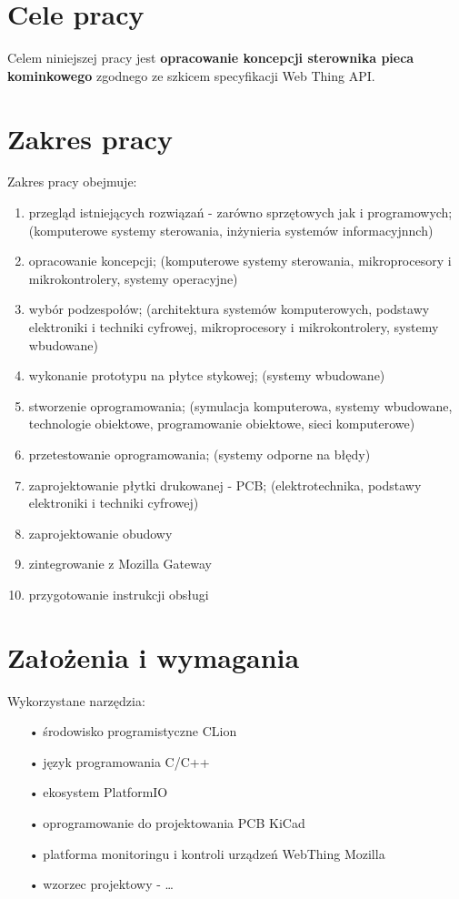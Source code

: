 \documentclass[12pt]{report}
\begin{document}
 \section{Cele pracy}
 Celem niniejszej pracy jest \textbf{opracowanie koncepcji sterownika pieca kominkowego} zgodnego ze szkicem specyfikacji Web Thing API.
 
 \section{Zakres pracy}
 Zakres pracy obejmuje:
 \begin{enumerate}
 \item przegląd istniejących rozwiązań - zarówno sprzętowych jak i programowych; (komputerowe systemy sterowania, inżynieria systemów informacyjnnch)
 \item opracowanie koncepcji; (komputerowe systemy sterowania, mikroprocesory i mikrokontrolery, systemy operacyjne)
 \item wybór podzespołów; (architektura systemów komputerowych, podstawy elektroniki i techniki cyfrowej, mikroprocesory i mikrokontrolery, systemy wbudowane)
 \item wykonanie prototypu na płytce stykowej; (systemy wbudowane)
 \item stworzenie oprogramowania; (symulacja komputerowa, systemy wbudowane, technologie obiektowe, programowanie obiektowe, sieci komputerowe)
 \item przetestowanie oprogramowania; (systemy odporne na błędy)
 \item zaprojektowanie płytki drukowanej - PCB; (elektrotechnika, podstawy elektroniki i techniki cyfrowej)
 \item zaprojektowanie obudowy
 \item zintegrowanie z Mozilla Gateway
 \item przygotowanie instrukcji obsługi
 \end{enumerate}
 
 \section{Założenia i wymagania}
 
 Wykorzystane narzędzia:
 \begin{enumerate}
 \item[•] środowisko programistyczne CLion
 \item[•] język programowania C/C++
 \item[•] ekosystem PlatformIO
 \item[•] oprogramowanie do projektowania PCB KiCad
 \item[•] platforma monitoringu i kontroli urządzeń WebThing Mozilla
 \item[•] wzorzec projektowy - \dots
 \end{enumerate}
 
\end{document}
